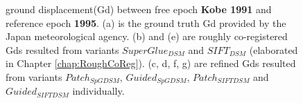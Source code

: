 \begin{figure}[htbp]
\begin{center}
		\caption{ground displacement(Gd) between free epoch \textbf{Kobe 1991} and reference epoch \textbf{1995}. (a) is the ground truth Gd provided by the Japan meteorological agency. (b) and (e) are roughly co-registered Gds resulted from variants $SuperGlue_{DSM}$ and $SIFT_{DSM}$ (elaborated in Chapter \ref{chap:RoughCoReg}). (c, d, f, g) are refined Gds resulted from variants $Patch_{SpGDSM}$, $Guided_{SpGDSM}$, $Patch_{SIFTDSM}$ and $Guided_{SIFTDSM}$ individually.}
		\label{GdKobe}
	\end{center}
\end{figure} 

